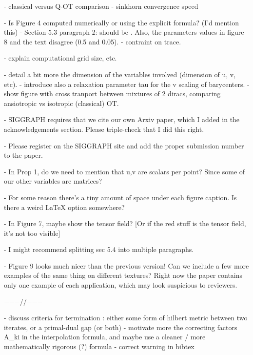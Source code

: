 - classical versus Q-OT comparison
- sinkhorn convergence speed

- Is Figure 4 computed numerically or using the explicit formula? (I'd mention this)
- Section 5.3 paragraph 2: \tau should be \rho. Also, the parameters values in figure 8 and the text disagree (0.5 and 0.05).
- contraint on trace.

- explain computational grid size, etc.


- detail a bit more the dimension of the variables involved (dimension of u, v, etc).
- introduce also a relaxation parameter tau for the v scaling of barycenters.
- show figure with cross tranport between mixtures of 2 diracs, comparing ansiotropic vs isotropic (classical) OT. 


- SIGGRAPH requires that we cite our own Arxiv paper, which I added in the acknowledgements section.  Please triple-check that I did this right.

- Please register on the SIGGRAPH site and add the proper submission number to the paper.

- In Prop 1, do we need to mention that u,v are scalars per point?  Since some of our other variables are matrices?

- For some reason there's a tiny amount of space under each figure caption.  Is there a weird LaTeX option somewhere?

- In Figure 7, maybe show the tensor field?  [Or if the red stuff is the tensor field, it's not too visible]

- I might recommend splitting sec 5.4 into multiple paragraphs.

- Figure 9 looks much nicer than the previous version!  Can we include a few more examples of the same thing on different textures?  Right now the paper contains only one example of each application, which may look suspicious to reviewers.


===//===

- discuss criteria for termination : either some form of hilbert metric between two iterates, or a primal-dual gap (or both)
- motivate more the correcting factors A_ki in the interpolation formula, and maybe use a cleaner / more mathematically rigorous (?) formula 
- correct warning in bibtex